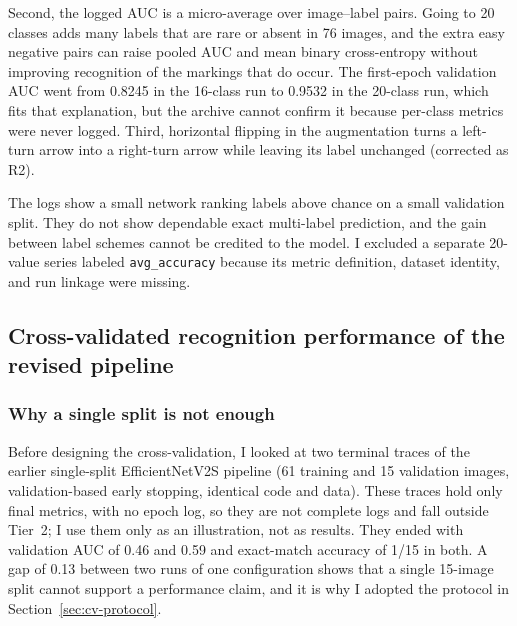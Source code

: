 \documentclass[11pt]{article}
\begin{document}
Second, the logged AUC is a micro-average over image--label pairs. Going to 20 classes adds many labels that are rare or absent in 76 images, and the extra easy negative pairs can raise pooled AUC and mean binary cross-entropy without improving recognition of the markings that do occur. The first-epoch validation AUC went from 0.8245 in the 16-class run to 0.9532 in the 20-class run, which fits that explanation, but the archive cannot confirm it because per-class metrics were never logged. Third, horizontal flipping in the augmentation turns a left-turn arrow into a right-turn arrow while leaving its label unchanged (corrected as R2).

The logs show a small network ranking labels above chance on a small validation split. They do not show dependable exact multi-label prediction, and the gain between label schemes cannot be credited to the model. I excluded a separate 20-value series labeled \texttt{avg\_accuracy} because its metric definition, dataset identity, and run linkage were missing.

\subsection{Cross-validated recognition performance of the revised pipeline}
\label{sec:cv-results}

\subsubsection*{Why a single split is not enough}
Before designing the cross-validation, I looked at two terminal traces of the earlier single-split EfficientNetV2S pipeline (61 training and 15 validation images, validation-based early stopping, identical code and data). These traces hold only final metrics, with no epoch log, so they are not complete logs and fall outside Tier~2; I use them only as an illustration, not as results. They ended with validation AUC of 0.46 and 0.59 and exact-match accuracy of 1/15 in both. A gap of 0.13 between two runs of one configuration shows that a single 15-image split cannot support a performance claim, and it is why I adopted the protocol in Section~\ref{sec:cv-protocol}.
\end{document}
